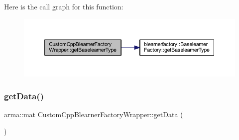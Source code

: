 Here is the call graph for this function\+:\nopagebreak
\begin{figure}[H]
\begin{center}
\leavevmode
\includegraphics[width=350pt]{class_custom_cpp_blearner_factory_wrapper_af2779851c3e2b288614a6d7152f5e3a1_cgraph}
\end{center}
\end{figure}
\mbox{\label{class_custom_cpp_blearner_factory_wrapper_a0fa7f0c2574f895b66ddc363b5d869ad}} 
\subsubsection{\texorpdfstring{get\+Data()}{getData()}}
{\footnotesize\ttfamily arma\+::mat Custom\+Cpp\+Blearner\+Factory\+Wrapper\+::get\+Data (\begin{DoxyParamCaption}{ }\end{DoxyParamCaption})\hspace{0.3cm}{\ttfamily [inline]}}

